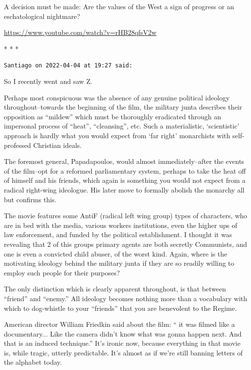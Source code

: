 A decision must be made: Are the values of the West a sign of progress or an eschatological nightmare?

\url{https://www.youtube.com/watch?v=rHB28qfsV2w}


\begin{center}* * *\end{center}

\begin{footnotesize}
\begin{sffamily}
\texttt{Santiago on 2022-04-04 at 19:27 said:}

So I recently went and saw Z.

Perhaps most conspicuous was the absence of any genuine political ideology throughout--towards the beginning of the film, the military junta describes their opposition as ``mildew'' which must be thoroughly eradicated through an impersonal process of ``heat'', ``cleansing'', etc. Such a materialistic, `scientistic' approach is hardly what you would expect from `far right' monarchists with self-professed Christian ideals.

The foremost general, Papadapoulos, would almost immediately--after the events of the film--opt for a reformed parliamentary system, perhaps to take the heat off of himself and his friends, which again is something you would not expect from a radical right-wing ideologue. His later move to formally abolish the monarchy all but confirms this.

The movie features some AntiF (radical left wing group) types of characters, who are in bed with the media, various workers institutions, even the higher ups of law enforcement, and funded by the political establishment. I thought it was revealing that 2 of this groups primary agents are both secretly Communists, and one is even a convicted child abuser, of the worst kind. Again, where is the motivating ideology behind the military junta if they are so readily willing to employ such people for their purposes?

The only distinction which is clearly apparent throughout, is that between ``friend'' and ``enemy.'' All ideology becomes nothing more than a vocabulary with which to dog-whistle to your ``friends'' that you are benevolent to the Regime.

American director William Friedkin said about the film: `` it was filmed like a documentary... Like the camera didn't know what was gonna happen next. And that is an induced technique.'' It's ironic now, because everything in that movie is, while tragic, utterly predictable. It's almost as if we're still banning letters of the alphabet today.


\end{sffamily}
\end{footnotesize}

